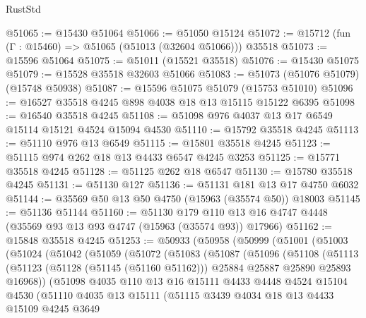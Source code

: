 \begin{lexlean}{RustStd}
\begin{coremodule}
@51065 := @15430 @51064
@51066 := @51050 @15124
@51072 := @15712 (fun (Γ : @15460) => @51065 (@51013 (@32604 @51066))) @35518
@51073 := @15596 @51064
@51075 := @51011 (@15521 @35518)
@51076 := @15430 @51075
@51079 := @15528 @35518 @32603 @51066
@51083 := @51073 (@51076 @51079) (@15748 @50938)
@51087 := @15596 @51075 @51079 (@15753 @51010)
@51096 := @16527 @35518 @4245 @898 @4038 @18 @13 @15115 @15122 @6395
@51098 := @16540 @35518 @4245
@51108 := @51098 @976 @4037 @13 @17 @6549 @15114 @15121 @4524 @15094 @4530
@51110 := @15792 @35518 @4245
@51113 := @51110 @976 @13 @6549
@51115 := @15801 @35518 @4245
@51123 := @51115 @974 @262 @18 @13 @4433 @6547 @4245 @3253
@51125 := @15771 @35518 @4245
@51128 := @51125 @262 @18 @6547
@51130 := @15780 @35518 @4245
@51131 := @51130 @127
@51136 := @51131 @181 @13 @17 @4750 @6032
@51144 := @35569 @50 @13 @50 @4750 (@15963 (@35574 @50)) @18003
@51145 := @51136 @51144
@51160 := @51130
    @179
    @110
    @13
    @16
    @4747
    @4448
    (@35569 @93 @13 @93 @4747 (@15963 (@35574 @93)) @17966)
@51162 := @15848 @35518 @4245
@51253 := @50933
    (@50958
      (@50999
        (@51001
          (@51003
            (@51024
              (@51042
                (@51059
                  (@51072
                    (@51083
                      (@51087
                        (@51096
                          (@51108
                            (@51113
                              (@51123
                                (@51128 (@51145 (@51160 @51162)))
                                @25884
                                @25887
                                @25890
                                @25893
                                @16968))
                            (@51098
                              @4035
                              @110
                              @13
                              @16
                              @15111
                              @4433
                              @4448
                              @4524
                              @15104
                              @4530
                              (@51110
                                @4035
                                @13
                                @15111
                                (@51115
                                  @3439
                                  @4034
                                  @18
                                  @13
                                  @4433
                                  @15109
                                  @4245
                                  @3649

\end{coremodule}
\end{lexlean}
